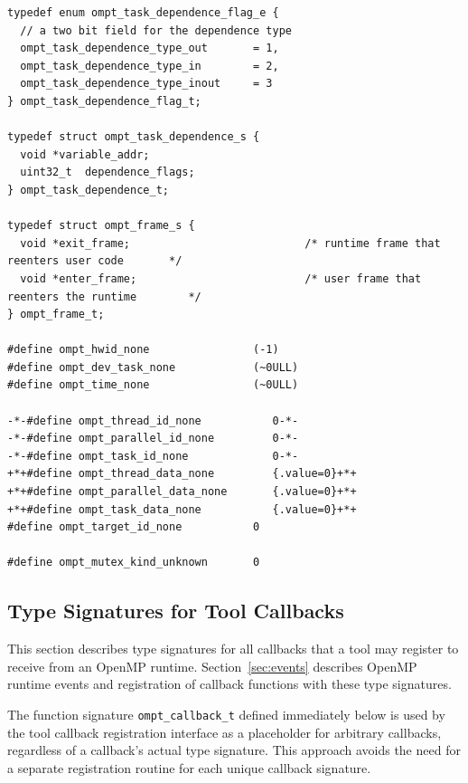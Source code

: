 \documentclass{article}
\begin{document}
\begin{lstlisting}
typedef enum ompt_task_dependence_flag_e {
  // a two bit field for the dependence type
  ompt_task_dependence_type_out       = 1,
  ompt_task_dependence_type_in        = 2,
  ompt_task_dependence_type_inout     = 3
} ompt_task_dependence_flag_t;

typedef struct ompt_task_dependence_s {
  void *variable_addr;
  uint32_t  dependence_flags;
} ompt_task_dependence_t;

typedef struct ompt_frame_s {
  void *exit_frame;                           /* runtime frame that reenters user code       */
  void *enter_frame;                          /* user frame that reenters the runtime        */
} ompt_frame_t;

#define ompt_hwid_none                (-1)
#define ompt_dev_task_none            (~0ULL)
#define ompt_time_none                (~0ULL)

-*-#define ompt_thread_id_none           0-*-
-*-#define ompt_parallel_id_none         0-*-
-*-#define ompt_task_id_none             0-*-
+*+#define ompt_thread_data_none         {.value=0}+*+
+*+#define ompt_parallel_data_none       {.value=0}+*+
+*+#define ompt_task_data_none           {.value=0}+*+
#define ompt_target_id_none           0

#define ompt_mutex_kind_unknown       0\end{lstlisting} \clearpage

\subsection{Type Signatures for Tool Callbacks}
\label{appendix:ompt-types:callbacks}
This section describes type signatures for all  callbacks that a tool may register to receive from an OpenMP runtime. Section~\ref{sec:events} describes OpenMP runtime events and registration of
callback functions with these type signatures.

The function signature  \lstinline|ompt_callback_t| defined immediately below is used by the tool callback registration interface as a placeholder for arbitrary callbacks,
 regardless of a callback's actual type signature. This approach avoids the need for a separate registration routine for each unique callback signature. 
\end{document}
